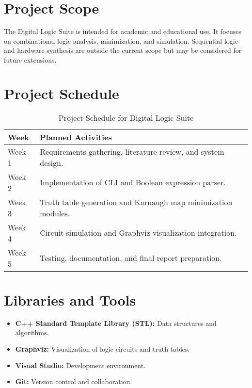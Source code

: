\documentclass[a4paper,12pt]{article}
\begin{document}
\section{Project Scope}
The Digital Logic Suite is intended for academic and educational use. It focuses on combinational logic analysis, minimization, and simulation. Sequential logic and hardware synthesis are outside the current scope but may be considered for future extensions.

\newpage
\section{Project Schedule}
\begin{table}[h!]
    \centering
    \begin{tabular}{|>{\raggedright}p{2cm}|p{10cm}|}
        \hline
        \textbf{Week} & \textbf{Planned Activities}                                   \\
        \hline
        Week 1        & Requirements gathering, literature review, and system design. \\
        \hline
        Week 2        & Implementation of CLI and Boolean expression parser.          \\
        \hline
        Week 3        & Truth table generation and Karnaugh map minimization modules. \\
        \hline
        Week 4        & Circuit simulation and Graphviz visualization integration.    \\
        \hline
        Week 5        & Testing, documentation, and final report preparation.         \\
        \hline
    \end{tabular}
    \caption{Project Schedule for Digital Logic Suite}
\end{table}


\section{Libraries and Tools}
\begin{itemize}
    \item \textbf{C++ Standard Template Library (STL):} Data structures and algorithms.
    \item \textbf{Graphviz:} Visualization of logic circuits and truth tables.
    \item \textbf{Visual Studio:} Development environment.
    \item \textbf{Git:} Version control and collaboration.
\end{itemize}
\end{document}
